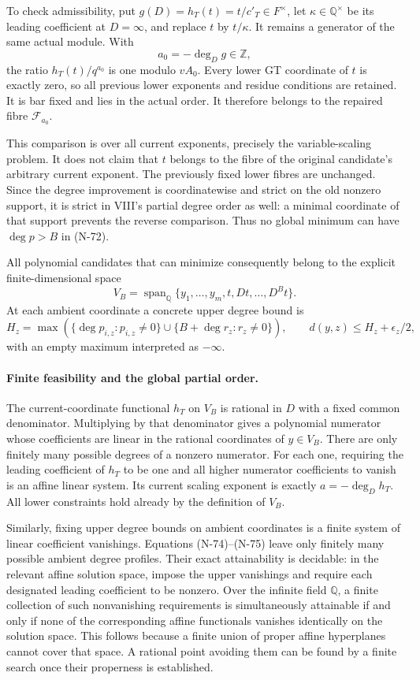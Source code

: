 To check admissibility, put $g(D)=h_T(t)=t/c'_T\in F^\times$,
let $\kappa\in\mathbb Q^\times$ be its leading coefficient
at $D=\infty$, and replace $t$ by $t/\kappa$.
It remains a generator of the same actual module.
With
\[
                     a_0=-\deg_D g\in\mathbb Z,
\]
the ratio $h_T(t)/q^{a_0}$ is one modulo $vA_0$.
Every lower GT coordinate of $t$ is exactly zero, so all
previous lower exponents and residue conditions are retained.
It is bar fixed and lies in the actual order.  It therefore
belongs to the repaired fibre $\mathcal F_{a_0}$.

This comparison is over all current exponents, precisely
the variable-scaling problem.  It does not claim that $t$
belongs to the fibre of the original candidate's arbitrary
current exponent.  The previously fixed lower fibres are
unchanged.  Since the degree improvement is coordinatewise
and strict on the old nonzero support, it is strict in
VIII's partial degree order as well: a minimal coordinate
of that support prevents the reverse comparison.
Thus no global minimum can have $\deg p>B$ in (N-72).

All polynomial candidates that can minimize consequently
belong to the explicit finite-dimensional space
\[
 V_B=\operatorname{span}_{\mathbb Q}
       \{y_1,\ldots,y_m,t,Dt,\ldots,D^B t\}.
 \tag{N-74}
\]
At each ambient coordinate a concrete upper degree bound is
\[
 H_z=\max\left(\{\deg p_{i,z}:p_{i,z}\ne0\}
           \cup\{B+\deg r_z:r_z\ne0\}\right),
 \qquad
 d(y,z)\le H_z+\epsilon_z/2,
 \tag{N-75}
\]
with an empty maximum interpreted as $-\infty$.

\paragraph{Finite feasibility and the global partial order.}
The current-coordinate functional $h_T$ on $V_B$ is rational
in $D$ with a fixed common denominator.  Multiplying by that
denominator gives a polynomial numerator whose coefficients
are linear in the rational coordinates of $y\in V_B$.
There are only finitely many possible degrees of a nonzero
numerator.  For each one, requiring the leading coefficient
of $h_T$ to be one and all higher numerator coefficients to
vanish is an affine linear system.  Its current scaling
exponent is exactly $a=-\deg_D h_T$.  All lower constraints
hold already by the definition of $V_B$.

Similarly, fixing upper degree bounds on ambient coordinates
is a finite system of linear coefficient vanishings.
Equations (N-74)--(N-75) leave only finitely many possible
ambient degree profiles.  Their exact attainability is
decidable: in the relevant affine solution space, impose
the upper vanishings and require each designated leading
coefficient to be nonzero.  Over the infinite field
$\mathbb Q$, a finite collection of such nonvanishing
requirements is simultaneously attainable if and only if
none of the corresponding affine functionals vanishes
identically on the solution space.  This follows because
a finite union of proper affine hyperplanes cannot cover
that space.  A rational point avoiding them can be found
by a finite search once their properness is established.

